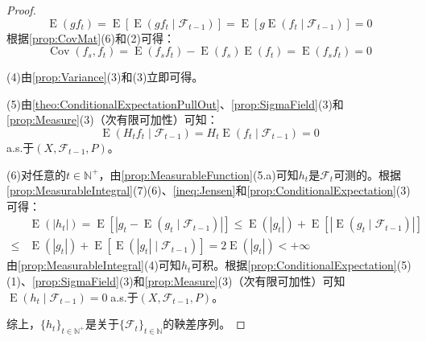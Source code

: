 \begin{proof}
	\begin{equation*}
		\operatorname{E}(gf_t)=\operatorname{E}[\operatorname{E}(gf_t\mid\mathscr{F}_{t-1})]=\operatorname{E}[g\operatorname{E}(f_t\mid\mathscr{F}_{t-1})]=0
	\end{equation*}
	根据\cref{prop:CovMat}(6)和(2)可得：
	\begin{equation*}
		\operatorname{Cov}(f_s,f_t)=\operatorname{E}(f_sf_t)-\operatorname{E}(f_s)\operatorname{E}(f_t)=\operatorname{E}(f_sf_t)=0
	\end{equation*}\par
	(4)由\cref{prop:Variance}(3)和(3)立即可得。\par
	(5)由\cref{theo:ConditionalExpectationPullOut}、\cref{prop:SigmaField}(3)和\cref{prop:Measure}(3)（次有限可加性）可知：
	\begin{equation*}
		\operatorname{E}(H_tf_t\mid\mathscr{F}_{t-1})=H_t\operatorname{E}(f_t\mid\mathscr{F}_{t-1})=0
	\end{equation*}
	a.s.于$(X,\mathscr{F}_{t-1},P)$。\par
	(6)对任意的$t\in\mathbb{N}^+$，由\cref{prop:MeasurableFunction}(5.a)可知$h_t$是$\mathscr{F}_t$可测的。根据\cref{prop:MeasurableIntegral}(7)(6)、\cref{ineq:Jensen}和\cref{prop:ConditionalExpectation}(3)可得：
	\begin{align*}
		&\operatorname{E}(|h_t|)=\operatorname{E}[|g_t-\operatorname{E}(g_t\mid\mathscr{F}_{t-1})|]\leqslant\operatorname{E}(|g_t|)+\operatorname{E}[|\operatorname{E}(g_t\mid\mathscr{F}_{t-1})|] \\
		\leqslant&\operatorname{E}(|g_t|)+\operatorname{E}[\operatorname{E}(|g_t|\mid\mathscr{F}_{t-1})]=2\operatorname{E}(|g_t|)<+\infty
	\end{align*}
	由\cref{prop:MeasurableIntegral}(4)可知$h_t$可积。根据\cref{prop:ConditionalExpectation}(5)(1)、\cref{prop:SigmaField}(3)和\cref{prop:Measure}(3)（次有限可加性）可知$\operatorname{E}(h_t\mid\mathscr{F}_{t-1})=0\;$a.s.于$(X,\mathscr{F}_{t-1},P)$。\par
	综上，$\{h_t\}_{t\in\mathbb{N}^+}$是关于$\{\mathscr{F}_t\}_{t\in\mathbb{N}}$的鞅差序列。
\end{proof}